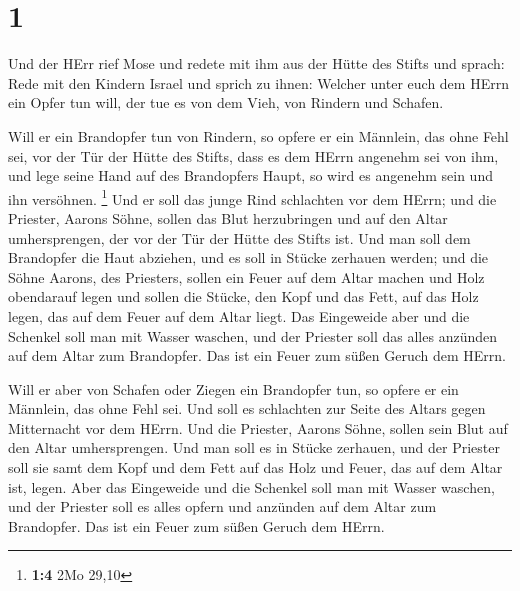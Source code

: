 \hypertarget{section}{%
\section{1}\label{section}}

 Und der HErr rief Mose und redete mit ihm aus der Hütte des
Stifts und sprach:  Rede mit den Kindern Israel und sprich
zu ihnen: Welcher unter euch dem HErrn ein Opfer tun will, der tue es
von dem Vieh, von Rindern und Schafen.

 Will er ein Brandopfer tun von Rindern, so opfere er ein
Männlein, das ohne Fehl sei, vor der Tür der Hütte des Stifts, dass es
dem HErrn angenehm sei von ihm,  und lege seine Hand auf des
Brandopfers Haupt, so wird es angenehm sein und ihn versöhnen.
\footnote{\textbf{1:4} 2Mo 29,10}  Und er soll das junge
Rind schlachten vor dem HErrn; und die Priester, Aarons Söhne, sollen
das Blut herzubringen und auf den Altar umhersprengen, der vor der Tür
der Hütte des Stifts ist.  Und man soll dem Brandopfer die
Haut abziehen, und es soll in Stücke zerhauen werden;  und
die Söhne Aarons, des Priesters, sollen ein Feuer auf dem Altar machen
und Holz obendarauf legen  und sollen die Stücke, den Kopf
und das Fett, auf das Holz legen, das auf dem Feuer auf dem Altar liegt.
 Das Eingeweide aber und die Schenkel soll man mit Wasser
waschen, und der Priester soll das alles anzünden auf dem Altar zum
Brandopfer. Das ist ein Feuer zum süßen Geruch dem HErrn.

 Will er aber von Schafen oder Ziegen ein Brandopfer tun,
so opfere er ein Männlein, das ohne Fehl sei.  Und soll es
schlachten zur Seite des Altars gegen Mitternacht vor dem HErrn. Und die
Priester, Aarons Söhne, sollen sein Blut auf den Altar umhersprengen.
 Und man soll es in Stücke zerhauen, und der Priester soll
sie samt dem Kopf und dem Fett auf das Holz und Feuer, das auf dem Altar
ist, legen.  Aber das Eingeweide und die Schenkel soll man
mit Wasser waschen, und der Priester soll es alles opfern und anzünden
auf dem Altar zum Brandopfer. Das ist ein Feuer zum süßen Geruch dem
HErrn.

